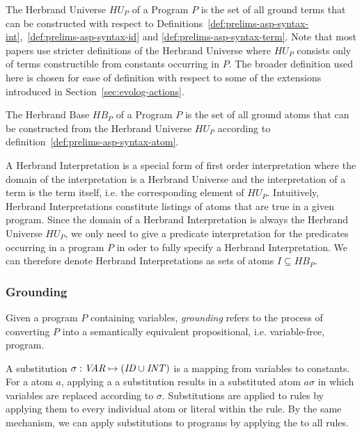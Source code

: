 \begin{definition}
\label{def:prelims-asp-semantics-hu}
The Herbrand Universe $HU_P$ of a Program $P$ is the set of all ground terms that can be constructed with respect to Definitions~\ref{def:prelims-asp-syntax-int},~\ref{def:prelims-asp-syntax-id} and \ref{def:prelims-asp-syntax-term}.
Note that most papers use stricter definitions of the Herbrand Universe where $HU_P$ consists only of terms constructible from constants occurring in $P$. The broader definition used here is chosen for ease of definition with respect to some of the extensions introduced in Section~\ref{sec:evolog-actions}.
\end{definition}

\begin{definition}
\label{def:prelims-asp-semantics-hb}
The Herbrand Base $HB_P$ of a Program $P$ is the set of all ground atoms that can be constructed from the Herbrand Universe $HU_P$ according to definition~\ref{def:prelims-asp-syntax-atom}. 
\end{definition}

\begin{definition}
\label{def:prelims-asp-semantics-herbrand-interpretation}
A Herbrand Interpretation is a special form of first order interpretation where the domain of the interpretation is a Herbrand Universe and the interpretation of a term is the term itself, i.e. the corresponding element of $HU_P$. Intuitively, Herbrand Interpretations constitute listings of atoms that are true in a given program. Since the domain of a Herbrand Interpretation is always the Herbrand Universe $HU_P$, we only need to give a predicate interpretation for the predicates occurring in a program $P$ in oder to fully specify a Herbrand Interpretation. We can therefore denote Herbrand Interpretations as sets of atoms $I \subseteq HB_P$.
\end{definition}

\subsubsection{Grounding}
\label{subsubsec:prelims-grounding}
Given a program $P$ containing variables, \emph{grounding} refers to the process of converting $P$ into a semantically equivalent propositional, i.e. variable-free, program.

\begin{definition}
\label{def:prelims-asp-semantics-substitution}
A substitution $\sigma: \mathit{VAR} \mapsto (\mathit{ID} \cup \mathit{INT})$ is a mapping from variables to constants. For a atom $a$, applying a a substitution results in a substituted atom $a\sigma$ in which variables are replaced according to $\sigma$. Substitutions are applied to rules  by applying them to every individual atom or literal within the rule. By the same mechanism, we can apply substitutions to programs by applying the to all rules.
\end{definition}

